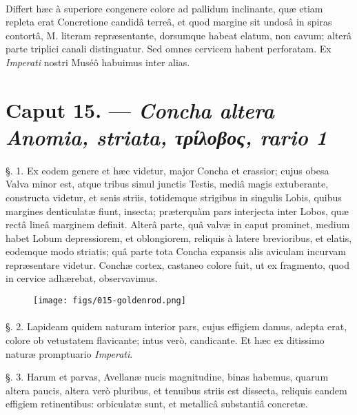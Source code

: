 \documentclass[a4paper, 11pt, oneside, polutonikogreek, german]{article}
\begin{document}
\paragraph{}
Differt hæc à superiore congenere colore ad pallidum inclinante, quæ etiam repleta erat Concretione candidâ terreâ, et quod margine sit undosâ in spiras contortâ, M. literam repræsentante, dorsumque habeat elatum, non cavum; alterâ parte triplici canali distinguatur. Sed omnes cervicem habent perforatam. Ex \emph{Imperati} nostri Muséô habuimus inter alias.

\section{Caput 15. --- \emph{Concha altera Anomia, striata, τρίλοβος, rario 1}}
\paragraph{}
§. 1. Ex eodem genere et hæc videtur, major Concha et crassior; cujus obesa Valva minor est, atque tribus simul junctis Testis, mediâ magis extuberante, constructa videtur, et senis striis, totidemque strigibus in singulis Lobis, quibus margines denticulatæ fiunt, insecta; præterquàm pars interjecta inter Lobos, quæ rectâ lineâ marginem definit. Alterâ parte, quâ valvæ in caput prominet, medium habet Lobum depressiorem, et oblongiorem, reliquis à latere brevioribus, et elatis, eodemque modo striatis; quâ parte tota Concha expansis alis aviculam incurvam repræsentare videtur. Conchæ cortex, castaneo colore fuit, ut ex fragmento, quod in cervice adhærebat, observavimus.

\begin{figure}[H]
\centering
\texttt{[image: figs/015-goldenrod.png]}

\end{figure}
\paragraph{}
§. 2. Lapideam quidem naturam interior pars, cujus effigiem damus, adepta erat, colore ob vetustatem flavicante; intus verò, candicante. Et hæc ex ditissimo naturæ promptuario \emph{Imperati}.

§. 3. Harum et parvas, Avellanæ nucis magnitudine, binas habemus, quarum altera paucis, altera verò pluribus, et tenuibus striis est dissecta, reliquis eandem effigiem retinentibus: orbiculatæ sunt, et metallicâ substantiâ concretæ.
\end{document}
